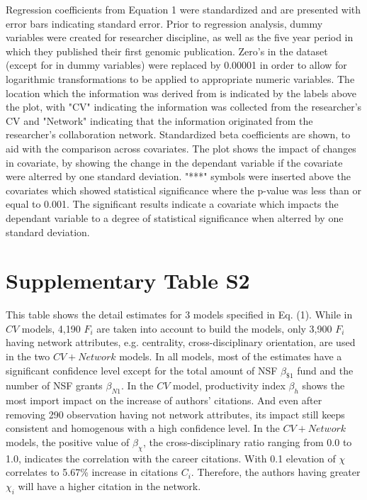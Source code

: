 \documentclass[10pt]{article}          %
\begin{document}
Regression coefficients from Equation 1 were standardized and are presented with error bars indicating standard error. Prior to regression analysis, dummy variables were created for researcher discipline, as well as the five year period in which they published their first genomic publication. Zero's in the dataset (except for in dummy variables) were replaced by 0.00001 in order to allow for logarithmic transformations to be applied to appropriate numeric variables. The location which the information was derived from is indicated by the labels above the plot, with "CV" indicating the information was collected from the researcher's CV and "Network" indicating that the information originated from the researcher's collaboration network. Standardized beta coefficients are shown, to aid with the comparison across covariates. The plot shows the impact of changes in covariate, by showing the change in the dependant variable if the covariate were alterred by one standard deviation. "***" symbols were inserted above the covariates which showed statistical significance where the p-value was less than or equal to 0.001. The significant results indicate a covariate which impacts the dependant variable to a degree of statistical significance when alterred by one standard deviation.

\newpage
\section{Supplementary Table S2}
\hspace{0.5cm}This table shows the detail estimates for 3 models specified in Eq. (1). While in $CV$ models, 4,190 $F_i$ are taken into account to build the models, only 3,900 $F_i$ having network attributes, e.g. centrality, cross-disciplinary orientation, are used in the two $CV + Network$ models. In all models, most of the estimates have a significant confidence level except for the total amount of NSF $\beta_{\$1}$ fund and the number of NSF grants $\beta_{N1}$. In the $CV$ model, productivity index $\beta_{h}$ shows the most import impact on the increase of authors' citations. And even after removing 290 observation having not network attributes, its impact still keeps consistent and homogenous with a high confidence level. In the $CV + Network$ models, the positive value of $\beta_{\chi}$, the cross-disciplinary ratio ranging from 0.0 to 1.0, indicates the correlation with the career citations. With 0.1 elevation of $\chi$ correlates to 5.67\% increase in citations $C_i$. Therefore, the authors having greater $\chi_i$ will have a higher citation in the network.\\
\bigskip
\end{document}
